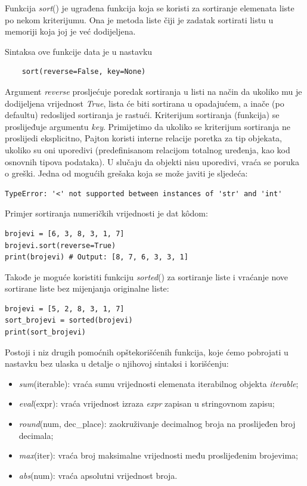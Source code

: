 Funkcija \textit{sort}() je ugrađena funkcija koja se koristi za sortiranje elemenata   liste po nekom kriterijumu. Ona je metoda liste čiji je zadatak sortirati listu u memoriji koja joj je već dodijeljena.

Sintaksa ove funkcije data je u nastavku 
\begin{verbatim}
	sort(reverse=False, key=None)
\end{verbatim}

Argument \textit{reverse} prosljećuje poredak sortiranja u listi na način da ukoliko mu je dodijeljena vrijednost \emph{True}, lista će biti sortirana u opadajućem, a inače (po defaultu) redoslijed sortiranja je rastući. Kriterijum sortiranja (funkcija) se proslijeđuje argumentu \textit{key}. Primi\-jetimo da ukoliko se kriterijum sortiranja ne proslijedi eksplicitno, Pajton koristi interne relacije poretka za tip objekata, ukoliko su oni uporedivi (predefinisanom relacijom totalnog uređenja, kao kod osno\-vnih tipova podataka). U slučaju da objekti nisu uporedivi, vraća se poruka o greški.  Jedna od mogućih grešaka koja se može javiti je sljedeća:
\begin{verbatim}
TypeError: '<' not supported between instances of 'str' and 'int'
\end{verbatim}


Primjer sortiranja numeričkih vrijednosti je dat k\^odom:
\begin{verbatim}
brojevi = [6, 3, 8, 3, 1, 7]
brojevi.sort(reverse=True)
print(brojevi) # Output: [8, 7, 6, 3, 3, 1]
\end{verbatim}
  Takođe je moguće koristiti funkciju \textit{sorted}() za sortiranje liste i vraćanje nove sortirane liste bez mijenjanja originalne liste:
\begin{verbatim}
brojevi = [5, 2, 8, 3, 1, 7]
sort_brojevi = sorted(brojevi)
print(sort_brojevi)
\end{verbatim}

Postoji i niz drugih pomoćnih opštekorišćenih funkcija, koje ćemo pobro\-jati u nastavku bez ulaska u detalje o njihovoj sintaksi i korišćenju:
\begin{itemize}
	\item \textit{sum}(iterable): vraća sumu vrijednosti elemenata iterabilnog obje\-kta \emph{iterable};
	\item \textit{eval}(expr): vraća vrijednost izraza \emph{expr} zapisan u stringovnom zapisu;
	\item \textit{round}(num, dec\_place): zaokruživanje decimalnog broja na prosli\-jeđen broj decimala;
	\item \textit{max}(iter): vraća broj maksimalne vrijednosti među proslijeđenim brojevima;
	\item \textit{abs}(num): vraća apsolutni vrijednost broja. 
\end{itemize}
